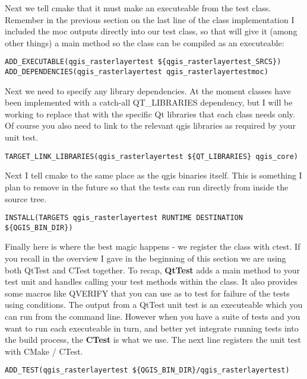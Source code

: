 Next we tell cmake that it must make an executeable from the test class. 
Remember in the previous section on the last line of the class implementation 
I included the moc outputs directly into our test class, so that will 
give it (among other things) a main method so the class can be 
compiled as an executeable:

\begin{verbatim}
ADD_EXECUTABLE(qgis_rasterlayertest ${qgis_rasterlayertest_SRCS})
ADD_DEPENDENCIES(qgis_rasterlayertest qgis_rasterlayertestmoc)
\end{verbatim}

Next we need to specify any library dependencies. At the moment classes 
have been implemented with a catch-all QT\_LIBRARIES dependency, but I will 
be working to replace that with the specific Qt libraries that each class 
needs only. Of course you also need to link to the relevant qgis 
libraries as required by your unit test.

\begin{verbatim}
TARGET_LINK_LIBRARIES(qgis_rasterlayertest ${QT_LIBRARIES} qgis_core)
\end{verbatim}

Next I tell cmake to the same place as the qgis binaries itself. This 
is something I plan to remove in the future so that the tests can 
run directly from inside the source tree.

\begin{verbatim}
INSTALL(TARGETS qgis_rasterlayertest RUNTIME DESTINATION ${QGIS_BIN_DIR})
\end{verbatim}

Finally here is where the best magic happens - we register the class with 
ctest. If you recall in the overview I gave in the beginning of this 
section we are using both QtTest and CTest together. To recap, \textbf{QtTest} adds a 
main method to your test unit and handles calling your test methods within 
the class. It also provides some macros like QVERIFY that you can use as 
to test for failure of the tests using conditions. The output from 
a QtTest unit test is an executeable which you can run from the command line. 
However when you have a suite of tests and you want to run each executeable 
in turn, and better yet integrate running tests into the build process, 
the \textbf{CTest} is what we use. The next line registers the unit test with 
CMake / CTest.

\begin{verbatim}
ADD_TEST(qgis_rasterlayertest ${QGIS_BIN_DIR}/qgis_rasterlayertest)
\end{verbatim}

